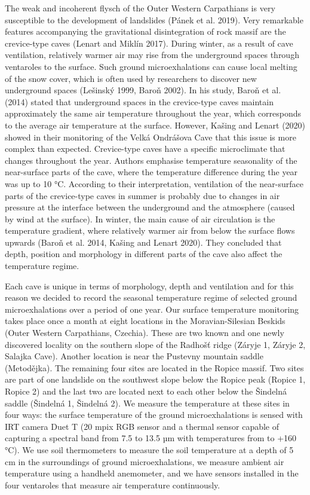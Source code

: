 {The weak and incoherent flysch of the Outer Western Carpathians is very susceptible to the development of landslides (Pánek et al. 2019). Very remarkable features accompanying the gravitational disintegration of rock massif are the crevice-type caves (Lenart and Miklín 2017). During winter, as a result of cave ventilation, relatively warmer air may rise from the underground spaces through ventaroles to the surface. Such ground microexhalations can cause local melting of the snow cover, which is often used by researchers to discover new underground spaces (Lešinský 1999, Baroň 2002). In his study, Baroň et al. (2014) stated that underground spaces in the crevice-type caves maintain approximately the same air temperature throughout the year, which corresponds to the average air temperature at the surface. However, Kašing and Lenart (2020) showed in their monitoring of the Velká Ondrášova Cave that this issue is more complex than expected. Crevice-type caves have a specific microclimate that changes throughout the year. Authors emphasise temperature seasonality of the near-surface parts of the cave, where the temperature difference during the year was up to 10 °C. According to their interpretation, ventilation of the near-surface parts of the crevice-type caves in summer is probably due to changes in air pressure at the interface between the underground and the atmosphere (caused by wind at the surface). In winter, the main cause of air circulation is the temperature gradient, where relatively warmer air from below the surface flows upwards (Baroň et al. 2014, Kašing and Lenart 2020). They concluded that depth, position and morphology in different parts of the cave also affect the temperature regime.

Each cave is unique in terms of morphology, depth and ventilation and for this reason we decided to record the seasonal temperature regime of selected ground microexhalations over a period of one year. Our surface temperature monitoring takes place once a month at eight locations in the Moravian-Silesian Beskids (Outer Western Carpathians, Czechia). These are two known and one newly discovered locality on the southern slope of the Radhošť ridge (Záryje 1, Záryje 2, Salajka Cave). Another location is near the Pustevny mountain saddle (Metodějka). The remaining four sites are located in the Ropice massif. Two sites are part of one landslide on the southwest slope below the Ropice peak (Ropice 1, Ropice 2) and the last two are located next to each other below the Šindelná saddle (Šindelná 1, Šindelná 2). We measure the temperature at these sites in four ways: the surface temperature of the ground microexhalations is sensed with IRT camera Duet T (20 mpix RGB sensor and a thermal sensor capable of capturing a spectral band from 7.5 to 13.5 µm with temperatures from  to +160 °C). We use soil thermometers to measure the soil temperature at a depth of 5 cm in the surroundings of ground microexhalations, we measure ambient air temperature using a handheld anemometer, and we have sensors installed in the four ventaroles that measure air temperature continuously.

}
